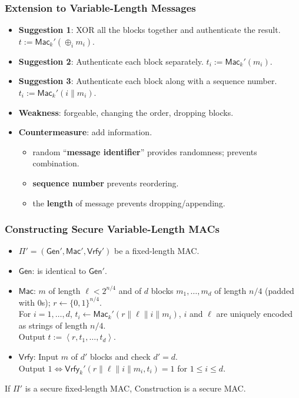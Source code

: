 \begin{frame}\frametitle{Extension to Variable-Length Messages}
\begin{itemize}
\item \textbf{Suggestion 1}: XOR all the blocks together and authenticate the result. $t := \mathsf{Mac}_k'(\oplus_i m_i)$.
\item \textbf{Suggestion 2}: Authenticate each block separately. $t_i := \mathsf{Mac}_k'(m_i)$.
\item \textbf{Suggestion 3}: Authenticate each block along with a sequence number. $t_i := \mathsf{Mac}_k'(i\| m_i)$.
\item \textbf{Weakness}: forgeable, changing the order, dropping blocks.
\item \textbf{Countermeasure}: add information. 
\begin{itemize}
\item random ``\textbf{message identifier}'' provides randomness; prevents combination.
\item \textbf{sequence number} prevents reordering.
\item the \textbf{length} of message prevents dropping/appending.
\end{itemize}
\end{itemize}
\end{frame}
\begin{frame}\frametitle{Constructing Secure Variable-Length MACs}
\begin{construction}
\begin{itemize}
\item $\Pi' = (\mathsf{Gen}', \mathsf{Mac}', \mathsf{Vrfy}')$ be a fixed-length MAC.
\item $\mathsf{Gen}$: is identical to $\mathsf{Gen}'$.
\item $\mathsf{Mac}$: $m$ of length $\ell < 2^{n/4}$ and of $d$ blocks $m_1,\dotsc,m_d $ of length $n/4$ (padded with 0s); $r \gets \{0,1\}^{n/4}$.\\
For $i=1,\dotsc,d$, $t_i \gets \mathsf{Mac}_k'(r\| \ell\| i\| m_i)$, $i$ and $\ell$ are uniquely encoded as strings of length $n/4$.\\
Output $t:=\left<r,t_1,\dotsc,t_d\right>$.
\item $\mathsf{Vrfy}$: Input $m$ of $d'$ blocks and check $d'=d$.\\
Output $1 \iff \mathsf{Vrfy}_k'(r\| \ell\| i\| m_i, t_i)=1$ for $1\le i \le d$.
\end{itemize}
\end{construction}
\begin{theorem}
If $\Pi'$ is a secure fixed-length MAC, Construction is a secure MAC.
\end{theorem}
\end{frame}
